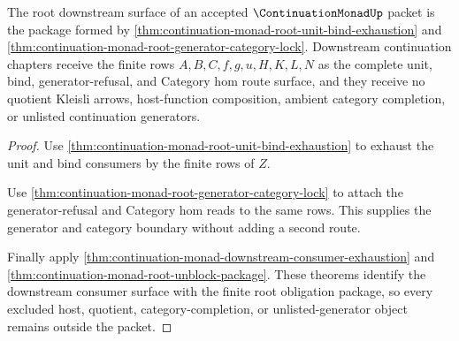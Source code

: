 \begin{theorem}
\label{thm:continuation-monad-root-downstream-unblock-package}
The root downstream surface of an accepted $\ContinuationMonadUp$ packet is the package formed by \autoref{thm:continuation-monad-root-unit-bind-exhaustion} and \autoref{thm:continuation-monad-root-generator-category-lock}. Downstream continuation chapters receive the finite rows $A,B,C,f,g,u,H,K,L,N$ as the complete unit, bind, generator-refusal, and Category hom route surface, and they receive no quotient Kleisli arrows, host-function composition, ambient category completion, or unlisted continuation generators.
\end{theorem}
\begin{proof}
Use \autoref{thm:continuation-monad-root-unit-bind-exhaustion} to exhaust the unit and bind consumers by the finite rows of $Z$.

Use \autoref{thm:continuation-monad-root-generator-category-lock} to attach the generator-refusal and Category hom reads to the same rows. This supplies the generator and category boundary without adding a second route.

Finally apply \autoref{thm:continuation-monad-downstream-consumer-exhaustion} and \autoref{thm:continuation-monad-root-unblock-package}. These theorems identify the downstream consumer surface with the finite root obligation package, so every excluded host, quotient, category-completion, or unlisted-generator object remains outside the packet.
\end{proof}

